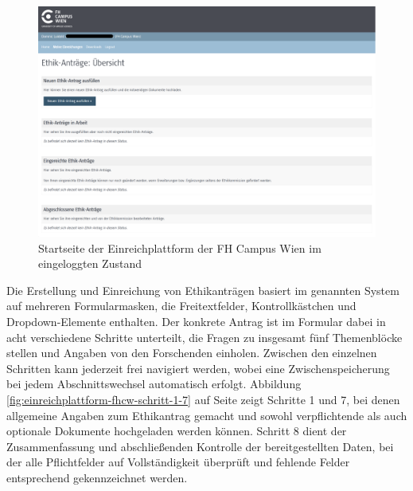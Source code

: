 \documentclass[a4paper,12pt,twoside,numbers=noendperiod]{scrreprt}
\begin{document}
\begin{figure}[ht]
    \centering
    \includegraphics[width=\linewidth]{thesis/images/Luidold_Einreichplattform-FH-Campus-Wien.png}
    \caption[Startseite der Einreichplattform der FH Campus Wien im eingeloggten Zustand]{Startseite der Einreichplattform der FH Campus Wien im eingeloggten Zustand \cite{ethikkommission_fh_campus_wien_fh_2023}}
    \label{fig:startseite-einreichplattform-fhcw}
\end{figure}

\medskip 

Die Erstellung und Einreichung von Ethikanträgen basiert im genannten System auf mehreren Formularmasken, die Freitextfelder, Kontrollkästchen und Dropdown-Elemente enthalten. Der konkrete Antrag ist im Formular dabei in acht verschiedene Schritte unterteilt, die Fragen zu insgesamt fünf Themenblöcke stellen und Angaben von den Forschenden einholen. Zwischen den einzelnen Schritten kann jederzeit frei navigiert werden, wobei eine Zwischenspeicherung bei jedem Abschnittswechsel automatisch erfolgt. Abbildung \ref{fig:einreichplattform-fhcw-schritt-1-7} auf Seite \pageref{fig:einreichplattform-fhcw-schritt-1-7} zeigt Schritte 1 und 7, bei denen allgemeine Angaben zum Ethikantrag gemacht und sowohl verpflichtende als auch optionale Dokumente hochgeladen werden können. Schritt 8 dient der Zusammenfassung und abschließenden Kontrolle der bereitgestellten Daten, bei der alle Pflichtfelder auf Vollständigkeit überprüft und fehlende Felder entsprechend gekennzeichnet werden.
\end{document}
